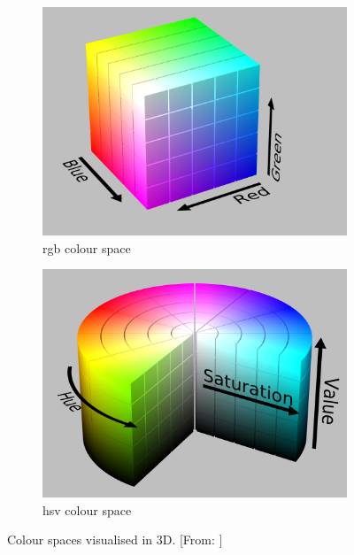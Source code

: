 \begin{figure}[!h]
	\centering
	\begin{subfigure}{.475\textwidth}
		\centering
		\includegraphics[width=.8\linewidth]{figs/RGB_Cube.png}
		\caption{\footnotesize{\ac{rgb} colour space}}
		\label{fig:rgb}
	\end{subfigure}
	\begin{subfigure}{.475\textwidth}
		\centering
		\includegraphics[width=.8\linewidth]{figs/HSV_color.png}
		\caption{\footnotesize{\ac{hsv} colour space}}
		\label{fig:hsv}
	\end{subfigure}
	\caption{\footnotesize{Colour spaces visualised in 3D. [From: \citet{Horvath2011}]}}
	\label{fig:colourspace}
\end{figure}

